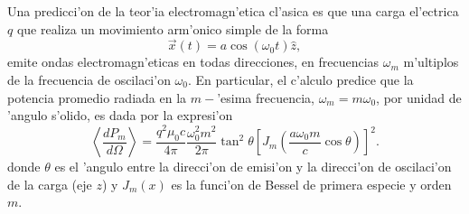 \documentclass[11pt]{exam}
\begin{document}
 Una predicci'on de la teor'ia electromagn'etica cl'asica es que una carga el'ectrica $q$ que realiza un movimiento arm'onico simple de la forma
\begin{equation}
\vec{x}(t) = a\cos(\omega_0t)\hat{z},
\end{equation}
emite ondas electromagn'eticas en todas direcciones, en frecuencias $\omega_m$ m'ultiplos  de la frecuencia de oscilaci'on $\omega_0$. En particular, el c'alculo predice que la potencia promedio radiada en la $m-$'esima frecuencia, $\omega_m = m\omega_0$, por unidad de 'angulo s'olido, es dada por la expresi'on
\begin{equation}
\left\langle \frac{dP_{m}}{d\Omega}\right\rangle
=\frac{q^2\mu_0 c}{4\pi}\frac{\omega_0^2m^2}{2\pi}\tan^2\theta\left[ J_{m}\left(\frac{a\omega_0 m}{c}\cos\theta\right)  \right]^2.
\end{equation}
donde $\theta$ es el 'angulo entre la direcci'on de emisi'on y la direcci'on de oscilaci'on de la carga (eje $z$) y $J_m(x)$ es la funci'on de Bessel de primera especie y orden $m$.
\end{document}
